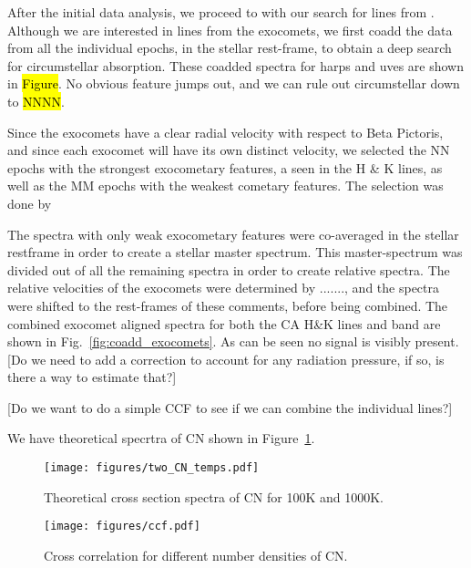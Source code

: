 \documentclass{aa}
\newcommand{\bp}{Beta Pictoris}
\begin{document}
After the initial data analysis, we proceed to with our search for lines from .
%
Although we are interested in lines from the exocomets, we first coadd the data from all the individual epochs, in the stellar rest-frame, to obtain a deep search for circumstellar  absorption.
%
These coadded spectra for \ac{harps} and \ac{uves} are shown in \hl{Figure}.
%
No obvious feature jumps out, and we can rule out circumstellar  down to \hl{NNNN}.

Since the exocomets have a clear radial velocity with respect to \bp{}, and since each exocomet will have its own distinct velocity, we selected the NN epochs with the strongest exocometary features, a seen in the  H \& K lines, as well as the MM epochs with the weakest cometary features.
%
The selection was done by

The spectra with only weak exocometary features were co-averaged in the stellar restframe in order to create a stellar master spectrum. This master-spectrum was divided out of all the remaining spectra in order to create relative spectra. 
The relative velocities of the exocomets were determined by ......., and the spectra were shifted to the rest-frames of these comments, before being combined. The combined exocomet aligned spectra for both the CA H\&K lines and  band are shown in Fig.~\ref{fig:coadd_exocomets}. As can be seen no signal is visibly present. [Do we need to add a correction to account for any radiation pressure, if so, is there a way to estimate that?]

[Do we want to do a simple CCF to see if we can combine the individual lines?]

We have theoretical specrtra of CN shown in Figure~\ref{fig:CN_theory}.

\begin{figure}
    \begin{centering}
        \texttt{[image: figures/two\_CN\_temps.pdf]}
        \caption{Theoretical cross section spectra of CN for 100K and 1000K.}
        \label{fig:CN_theory}
    \end{centering}
\end{figure}



\begin{figure}
    \begin{centering}
        \texttt{[image: figures/ccf.pdf]}
        \caption{Cross correlation for different number densities of CN.}
        \label{fig:ccf}
    \end{centering}
\end{figure}
\end{document}
